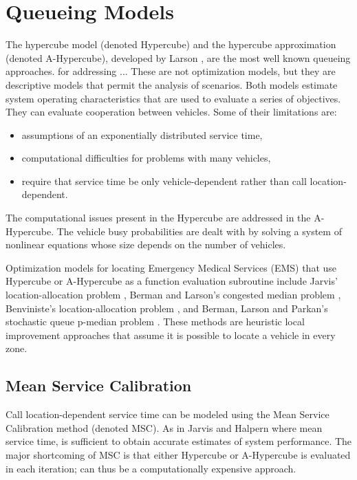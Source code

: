 \section{Queueing Models}
The hypercube model (denoted Hypercube)
and the hypercube approximation (denoted A-Hypercube),
developed by Larson  \cite{larson1974hypercube,larson1975approximating},
are the most well known queueing approaches.
for addressing ... %
These are not optimization models,
but they are descriptive models
that permit the analysis of scenarios.
Both models
estimate system operating characteristics
that are used to evaluate a series of objectives.
They can evaluate cooperation between vehicles.
Some of their limitations are:
\begin{itemize}
\item assumptions of an exponentially distributed service time,
\item computational difficulties for problems with many vehicles,
\item require that service time be only vehicle-dependent
  rather than call location-dependent.
\end{itemize}

The computational issues
present in the Hypercube
are addressed in the A-Hypercube.
The vehicle busy probabilities
are dealt with
by solving a system of nonlinear equations
whose size
depends on the number of vehicles.

Optimization models for locating Emergency Medical Services (EMS)
that use Hypercube or A-Hypercube as a function evaluation subroutine
include Jarvis' location-allocation problem \cite{jarvis1975optimization},
Berman and Larson's congested median problem \cite{berman1982median},
Benviniste's location-allocation problem \cite{benveniste1985solving},
and Berman, Larson and Parkan's
stochastic queue p-median problem \cite{berman1987stochastic}.
These methods are heuristic local improvement approaches
that assume it is possible to locate a vehicle in every zone.

\subsection{Mean Service Calibration}
Call location-dependent service time
can be modeled using the Mean Service Calibration method (denoted MSC).
As in Jarvis \cite{jarvis1975optimization} 
and Halpern \cite{halpern1977accuracy}
where
mean service time,
is sufficient
to obtain accurate estimates of system performance.
The major shortcoming of MSC is that either
Hypercube or A-Hypercube
is evaluated in each iteration;
can thus be a computationally expensive approach.

